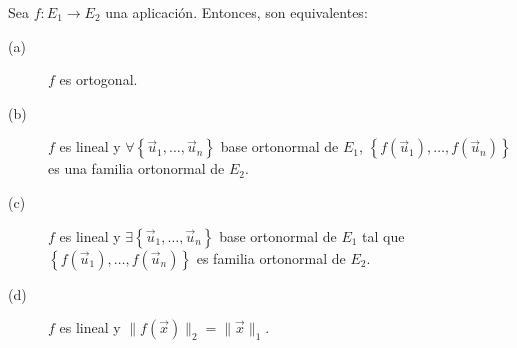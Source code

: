 \begin{ftheorem}[]
\normalfont Sea $\displaystyle f : E_{1} \to E_{2}$ una aplicación. Entonces, son equivalentes:
\begin{description}
\item[(a)] $\displaystyle f $ es ortogonal.
\item[(b)] $\displaystyle f $ es lineal y $\displaystyle \forall \left\{ \vec{u}_{1}, \ldots, \vec{u}_{n}\right\}  $ base ortonormal de $\displaystyle E_{1} $, $\displaystyle \left\{ f\left(\vec{u}_{1}\right), \ldots, f\left(\vec{u}_{n}\right)\right\}  $ es una familia ortonormal de $\displaystyle E_{2} $.
\item[(c)] $\displaystyle f $ es lineal y $\displaystyle \exists \left\{ \vec{u}_{1}, \ldots, \vec{u}_{n}\right\}  $ base ortonormal de $\displaystyle E_{1} $ tal que $\displaystyle \left\{ f\left(\vec{u}_{1}\right), \ldots, f\left(\vec{u}_{n}\right)\right\}  $ es familia ortonormal de $\displaystyle E_{2} $.
\item[(d)] $\displaystyle f $ es lineal y $\displaystyle \| f\left(\vec{x}\right)\|_{2} = \|\vec{x}\|_{1} $.
\end{description}
\end{ftheorem}
